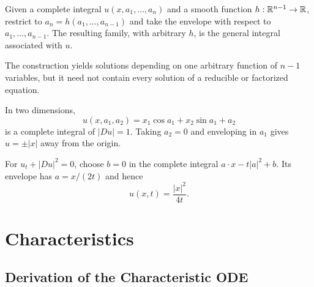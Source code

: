 \begin{definition}
\label{def:general-integral}

Given a complete integral $u(x,a_1,\ldots,a_n)$ and a smooth function
$h:\mathbb{R}^{n-1}\to\mathbb{R}$, restrict to $a_n=h(a_1,\ldots,a_{n-1})$ and take the
envelope with respect to $a_1,\ldots,a_{n-1}$. The resulting family, with
arbitrary $h$, is the general integral associated with $u$.
\end{definition}

\begin{remark}
\label{rem:general-integral-remarks}

The construction yields solutions depending on one arbitrary function of
$n-1$ variables, but it need not contain every solution of a reducible or
factorized equation.
\end{remark}

\begin{example}
\label{ex:eikonal-alternative-complete-integral}

In two dimensions,
\[
u(x,a_1,a_2)=x_1\cos a_1+x_2\sin a_1+a_2
\]
is a complete integral of $|Du|=1$. Taking $a_2=0$ and enveloping in $a_1$
gives $u=\pm|x|$ away from the origin.
\end{example}

\begin{example}
\label{ex:hamilton-jacobi-envelope-example}

For $u_t+|Du|^2=0$, choose $b=0$ in the complete integral
$a\cdot x-t|a|^2+b$. Its envelope has $a=x/(2t)$ and hence
\[
u(x,t)=\frac{|x|^2}{4t}.
\]
\end{example}

\section{Characteristics}
\label{sec:characteristics}

\subsection{Derivation of the Characteristic ODE}
\label{sec:characteristic-ode-derivation}

